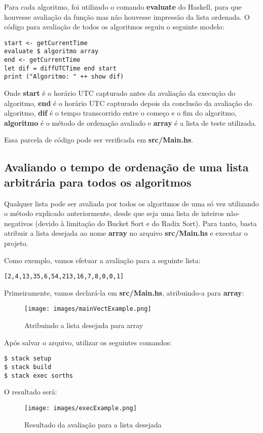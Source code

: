 \documentclass[12pt,a4paper]{article}
\begin{document}
Para cada algoritmo, foi utilizado o comando \textbf{evaluate} do Haskell, para que houvesse avaliação da função mas não houvesse impressão da lista ordenada. O código para avaliação de todos os algoritmos seguiu o seguinte modelo:

\begin{lstlisting}
start <- getCurrentTime
evaluate $ algoritmo array
end <- getCurrentTime
let dif = diffUTCTime end start
print ("Algoritmo: " ++ show dif)
\end{lstlisting}

Onde \textbf{start} é o horário UTC capturado antes da avaliação da execução do algoritmo, \textbf{end} é o horário UTC capturado depois da conclusão da avaliação do algoritmo, \textbf{dif} é o tempo transcorrido entre o começo e o fim do algoritmo, \textbf{algoritmo} é o método de ordenação avaliado e \textbf{array} é a lista de teste utilizada.

Essa parcela de código pode ser verificada em \textbf{src/Main.hs}.

\subsection{Avaliando o tempo de ordenação de uma lista arbitrária para todos os algoritmos}
Qualquer lista pode ser avaliada por todos os algoritmos de uma só vez utilizando o método explicado anteriormente, desde que seja uma lista de inteiros não-negativos (devido à limitação do Bucket Sort e do Radix Sort). Para tanto, basta atribuir a lista desejada ao nome \textbf{array} no arquivo \textbf{src/Main.hs} e executar o projeto. 

Como exemplo, vamos efetuar a avaliação para a seguinte lista:
\begin{lstlisting}
[2,4,13,35,6,54,213,16,7,8,0,0,1]
\end{lstlisting}
Primeiramente, vamos declará-la em \textbf{src/Main.hs}, atribuindo-a para \textbf{array}:

\begin{figure}[h]
	\centering
	\texttt{[image: images/mainVectExample.png]}
	\caption{Atribuindo a lista desejada para array}
\end{figure}
Após salvar o arquivo, utilizar os seguintes comandos:

\begin{lstlisting}
$ stack setup
$ stack build
$ stack exec sorths
\end{lstlisting}

O resultado será:
\pagebreak
\begin{figure}[t]
	\centering
	\texttt{[image: images/execExample.png]}
	\caption{Resultado da avaliação para a lista desejada}
\end{figure}
\end{document}
